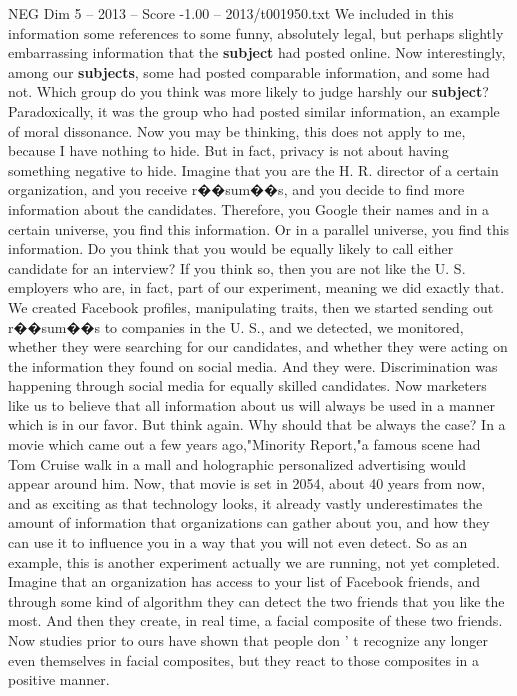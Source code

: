 \begin{textsample}{NEG Dim 5 – 2013 – Score -1.00 – 2013/t001950.txt}
We included in this information some references to some funny, absolutely legal, but perhaps slightly embarrassing information that the \textbf{subject} had posted online.
Now interestingly, among our \textbf{subjects}, some had posted comparable information, and some had not.
Which group do you think was more likely to judge harshly our \textbf{subject}?
Paradoxically, it was the group who had posted similar information, an example of moral dissonance.
Now you may be thinking, this does not apply to me, because I have nothing to hide.
But in fact, privacy is not about having something negative to hide.
Imagine that you are the H.
R. director of a certain organization, and you receive r{\EmojiFont �}{\EmojiFont �}sum{\EmojiFont �}{\EmojiFont �}s, and you decide to find more information about the candidates.
Therefore, you Google their names and in a certain universe, you find this information.
Or in a parallel universe, you find this information.
Do you think that you would be equally likely to call either candidate for an interview?
If you think so, then you are not like the U.
S. employers who are, in fact, part of our experiment, meaning we did exactly that.
We created Facebook profiles, manipulating traits, then we started sending out r{\EmojiFont �}{\EmojiFont �}sum{\EmojiFont �}{\EmojiFont �}s to companies in the U.
S., and we detected, we monitored, whether they were searching for our candidates, and whether they were acting on the information they found on social media.
And they were.
Discrimination was happening through social media for equally skilled candidates.
Now marketers like us to believe that all information about us will always be used in a manner which is in our favor.
But think again.
Why should that be always the case?
In a movie which came out a few years ago,"Minority Report,"a famous scene had Tom Cruise walk in a mall and holographic personalized advertising would appear around him.
Now, that movie is set in 2054, about 40 years from now, and as exciting as that technology looks, it already vastly underestimates the amount of information that organizations can gather about you, and how they can use it to influence you in a way that you will not even detect.
So as an example, this is another experiment actually we are running, not yet completed.
Imagine that an organization has access to your list of Facebook friends, and through some kind of algorithm they can detect the two friends that you like the most.
And then they create, in real time, a facial composite of these two friends.
Now studies prior to ours have shown that people don ' t recognize any longer even themselves in facial composites, but they react to those composites in a positive manner.

\end{textsample}
